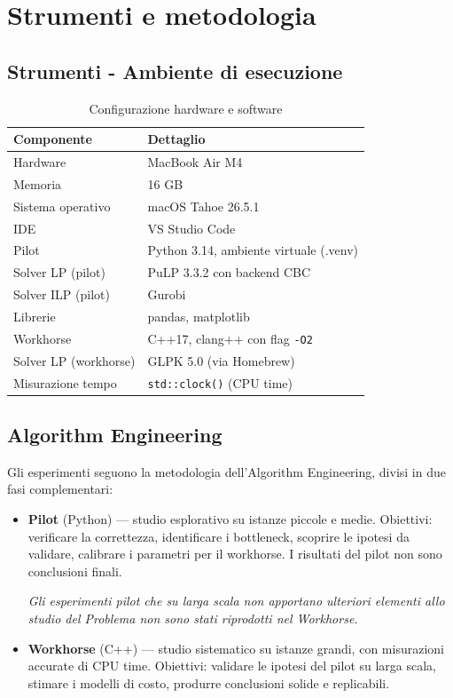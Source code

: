 \documentclass[12pt, a4paper]{article}
\begin{document}
\section{Strumenti e metodologia}

\subsection*{Strumenti - Ambiente di esecuzione}

\begin{table}[H]
\centering
\caption{Configurazione hardware e software}
\label{tab:setup}
\begin{tabular}{ll}
\toprule
Componente & Dettaglio \\
\midrule
Hardware   & MacBook Air M4 \\
Memoria    & 16 GB \\
Sistema operativo & macOS Tahoe 26.5.1 \\
IDE   & VS Studio Code \\
Pilot & Python 3.14, ambiente virtuale (.venv) \\
Solver LP (pilot) & PuLP 3.3.2 con backend CBC \\
Solver ILP (pilot) & Gurobi \\
Librerie & pandas, matplotlib \\
\midrule
Workhorse & C++17, clang++ con flag \texttt{-O2} \\
Solver LP (workhorse) & GLPK 5.0 (via Homebrew) \\
Misurazione tempo & \texttt{std::clock()} (CPU time) \\
\bottomrule
\end{tabular}
\end{table}

\subsection*{Algorithm Engineering}

Gli esperimenti seguono la metodologia dell'Algorithm Engineering,
divisi in due fasi complementari:

\begin{itemize}
    \item \textbf{Pilot} (Python) — studio esplorativo su istanze piccole
    e medie. Obiettivi: verificare la correttezza, identificare i bottleneck,
    scoprire le ipotesi da validare, calibrare i parametri per il workhorse.
    I risultati del pilot non sono conclusioni finali.
    
    \textit{Gli esperimenti pilot che su larga scala non apportano ulteriori elementi 
    allo studio del Problema non sono stati riprodotti nel Workhorse.}

    \item \textbf{Workhorse} (C++) — studio sistematico su istanze grandi,
    con misurazioni accurate di CPU time. Obiettivi: validare le ipotesi
    del pilot su larga scala, stimare i modelli di costo, produrre
    conclusioni solide e replicabili.
\end{itemize}
\end{document}
